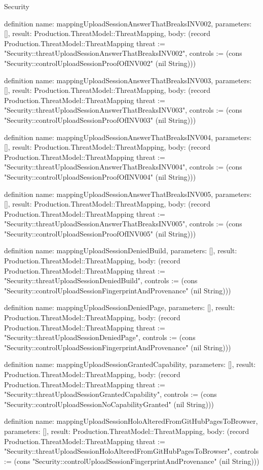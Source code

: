 \begin{lexlean}{Security}
\begin{semanticmodule}
definition{
  name: mappingUploadSessionAnswerThatBreaksINV002,
  parameters: [],
  result: Production.ThreatModel::ThreatMapping,
  body: (record Production.ThreatModel::ThreatMapping {threat := "Security::threatUploadSessionAnswerThatBreaksINV002", controls := (cons "Security::controlUploadSessionProofOfINV002" (nil String))})
}

definition{
  name: mappingUploadSessionAnswerThatBreaksINV003,
  parameters: [],
  result: Production.ThreatModel::ThreatMapping,
  body: (record Production.ThreatModel::ThreatMapping {threat := "Security::threatUploadSessionAnswerThatBreaksINV003", controls := (cons "Security::controlUploadSessionProofOfINV003" (nil String))})
}

definition{
  name: mappingUploadSessionAnswerThatBreaksINV004,
  parameters: [],
  result: Production.ThreatModel::ThreatMapping,
  body: (record Production.ThreatModel::ThreatMapping {threat := "Security::threatUploadSessionAnswerThatBreaksINV004", controls := (cons "Security::controlUploadSessionProofOfINV004" (nil String))})
}

definition{
  name: mappingUploadSessionAnswerThatBreaksINV005,
  parameters: [],
  result: Production.ThreatModel::ThreatMapping,
  body: (record Production.ThreatModel::ThreatMapping {threat := "Security::threatUploadSessionAnswerThatBreaksINV005", controls := (cons "Security::controlUploadSessionProofOfINV005" (nil String))})
}

definition{
  name: mappingUploadSessionDeniedBuild,
  parameters: [],
  result: Production.ThreatModel::ThreatMapping,
  body: (record Production.ThreatModel::ThreatMapping {threat := "Security::threatUploadSessionDeniedBuild", controls := (cons "Security::controlUploadSessionFingerprintAndProvenance" (nil String))})
}

definition{
  name: mappingUploadSessionDeniedPage,
  parameters: [],
  result: Production.ThreatModel::ThreatMapping,
  body: (record Production.ThreatModel::ThreatMapping {threat := "Security::threatUploadSessionDeniedPage", controls := (cons "Security::controlUploadSessionFingerprintAndProvenance" (nil String))})
}

definition{
  name: mappingUploadSessionGrantedCapability,
  parameters: [],
  result: Production.ThreatModel::ThreatMapping,
  body: (record Production.ThreatModel::ThreatMapping {threat := "Security::threatUploadSessionGrantedCapability", controls := (cons "Security::controlUploadSessionNoCapabilityGranted" (nil String))})
}

definition{
  name: mappingUploadSessionHoloAlteredFromGitHubPagesToBrowser,
  parameters: [],
  result: Production.ThreatModel::ThreatMapping,
  body: (record Production.ThreatModel::ThreatMapping {threat := "Security::threatUploadSessionHoloAlteredFromGitHubPagesToBrowser", controls := (cons "Security::controlUploadSessionFingerprintAndProvenance" (nil String))})
}


\end{semanticmodule}
\end{lexlean}
